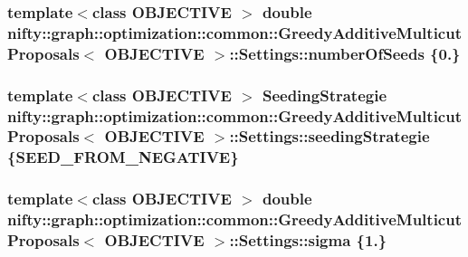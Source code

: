 \subsubsection[{number\+Of\+Seeds}]{\setlength{\rightskip}{0pt plus 5cm}template$<$class O\+B\+J\+E\+C\+T\+I\+V\+E $>$ double {\bf nifty\+::graph\+::optimization\+::common\+::\+Greedy\+Additive\+Multicut\+Proposals}$<$ O\+B\+J\+E\+C\+T\+I\+V\+E $>$\+::Settings\+::number\+Of\+Seeds \{0.\}}\label{structnifty_1_1graph_1_1optimization_1_1common_1_1GreedyAdditiveMulticutProposals_1_1Settings_ad862a463a3b266049c613cc729159bd0}
\hypertarget{structnifty_1_1graph_1_1optimization_1_1common_1_1GreedyAdditiveMulticutProposals_1_1Settings_a6dca32463236ea17fbdc418c8676c93c}{}
\subsubsection[{seeding\+Strategie}]{\setlength{\rightskip}{0pt plus 5cm}template$<$class O\+B\+J\+E\+C\+T\+I\+V\+E $>$ {\bf Seeding\+Strategie} {\bf nifty\+::graph\+::optimization\+::common\+::\+Greedy\+Additive\+Multicut\+Proposals}$<$ O\+B\+J\+E\+C\+T\+I\+V\+E $>$\+::Settings\+::seeding\+Strategie \{{\bf S\+E\+E\+D\+\_\+\+F\+R\+O\+M\+\_\+\+N\+E\+G\+A\+T\+I\+V\+E}\}}\label{structnifty_1_1graph_1_1optimization_1_1common_1_1GreedyAdditiveMulticutProposals_1_1Settings_a6dca32463236ea17fbdc418c8676c93c}
\hypertarget{structnifty_1_1graph_1_1optimization_1_1common_1_1GreedyAdditiveMulticutProposals_1_1Settings_ad115048107a1951b86c80951262ff20a}{}
\subsubsection[{sigma}]{\setlength{\rightskip}{0pt plus 5cm}template$<$class O\+B\+J\+E\+C\+T\+I\+V\+E $>$ double {\bf nifty\+::graph\+::optimization\+::common\+::\+Greedy\+Additive\+Multicut\+Proposals}$<$ O\+B\+J\+E\+C\+T\+I\+V\+E $>$\+::Settings\+::sigma \{1.\}}\label{structnifty_1_1graph_1_1optimization_1_1common_1_1GreedyAdditiveMulticutProposals_1_1Settings_ad115048107a1951b86c80951262ff20a}


